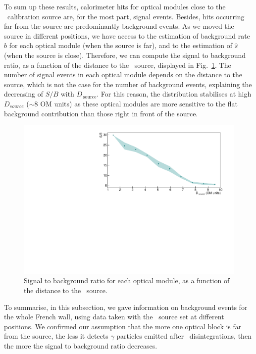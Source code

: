 To sum up these results, calorimeter hits for optical modules close to the \Co\ calibration source are, for the most part, signal events.
Besides, hits occurring far from the source are predominantly background events.
As we moved the source in different positions, we have access to the estimation of background rate $\hat{b}$ for each optical module (when the source is far), and to the estimation of $\hat{s}$ (when the source is close).
Therefore, we can compute the signal to background ratio, as a function of the distance to the \Co\ source, displayed in Fig.~\ref{fig:Co_ratioSB}.
The number of signal events in each optical module depends on the distance to the source, which is not the case for the number of background events, explaining the decreasing of $S/B$ with $D_{\,\text{source}}$.
For this reason, the distribution stabilises at high $D_{source}$ ($\sim8$ OM units) as these optical modules are more sensitive to the flat background contribution than those right in front of the source.
\begin{figure}[h]
  \centering
  \includegraphics[width=1.1\textwidth]{commissioning/fig_commissioning/Co_ratioSB_distance.pdf}
  \caption{Signal to background ratio for each optical module, as a function of the distance to the \Co\ source.
    \label{fig:Co_ratioSB}}
\end{figure}


To summarise, in this subsection, we gave information on background events for the whole French wall, using data taken with the \Co\ source set at different positions.
We confirmed our assumption that the more one optical block is far from the source, the less it detects $\gamma$ particles emitted after \Co\ disintegrations, then the more the signal to background ratio decreases.

